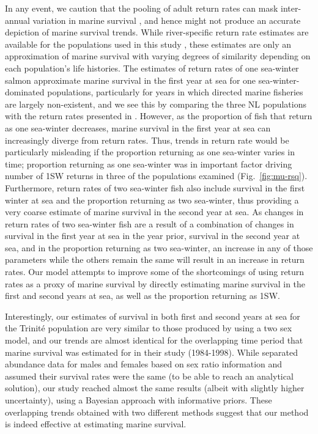 \documentclass[12pt]{article}
\begin{document}
In any event, we caution that the pooling of adult return rates
\citep{Chaput2012a, Friedland1993,Gibson2016} can mask inter-annual
variation in marine survival \citep{Hubley2011}, and hence might not produce
an accurate depiction of marine survival trends.
While river-specific return rate estimates are available for the populations
used in this study \citep{ICES2019}, these estimates are only an approximation
of marine survival with varying degrees of similarity depending on each
population's life histories. The estimates of return rates of one sea-winter salmon
approximate marine survival in the first year at sea for one
sea-winter-dominated populations, particularly for years in which 
directed marine fisheries are largely non-existent,
and we see this by comparing the three NL populations
with the return rates presented in \citet{ICES2019}. However, as the proportion of fish that
return as one sea-winter decreases, marine survival in the first year at sea
can increasingly diverge from return rates. Thus, trends in return rate
would be particularly misleading if the proportion returning as one sea-winter
varies in time;
proportion returning as one sea-winter was in important factor driving number of 
1SW returns in three of the populations examined (Fig.~\ref{fig:mu-rsq}).
Furthermore, return rates of two sea-winter fish also include survival in the
first winter at sea and the proportion returning as two sea-winter, thus
providing a very coarse estimate of marine survival in the second year at sea. 
As changes in return rates of two sea-winter fish are a result of a
combination of changes in survival in the first year at sea in the year prior,
survival in the second year at sea, and in the proportion returning as two
sea-winter, an increase in any of those parameters while the others remain
the same will result in an increase in return rates. Our model attempts to
improve some of the shortcomings of using return rates as a proxy of marine
survival by directly estimating marine survival in the first and second years
at sea, as well as the proportion returning as 1SW.

Interestingly, our estimates of survival in both first and second years at sea
for the Trinit\'{e} population are very similar to those produced by
\citet{Chaput2003b} using a two sex model, and our trends are almost identical
for the overlapping time period that marine survival was estimated for in
their study (1984-1998). While \citet{Chaput2003b} separated abundance data
for males and females based on sex ratio information and assumed their
survival rates were the same (to be able to reach an analytical solution), our
study reached almost the same results (albeit with slightly higher
uncertainty), using a Bayesian approach with informative priors. These
overlapping trends obtained with two different methods suggest that our method
is indeed effective at estimating marine survival.
\end{document}
